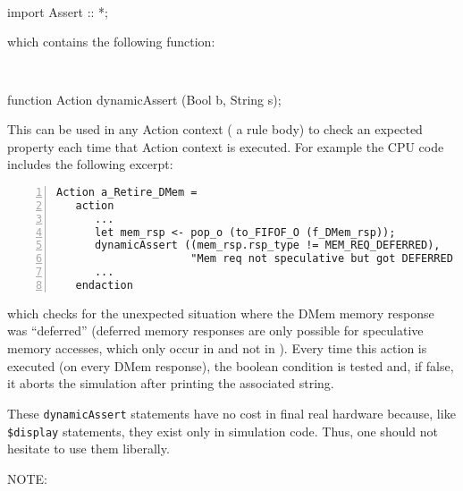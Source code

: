 {\tt
\begin{tabbing}
\hmmm import Assert :: *;
\end{tabbing}
}

which contains the following function:

{\tt
\begin{tabbing}
\hmmm function Action dynamicAssert (Bool b, String s);
\end{tabbing}
}

This can be used in any Action context ({\eg} a rule body) to check an
expected property each time that Action context is executed.  For
example the {\DRUM} CPU code includes the following excerpt:

{\footnotesize
\begin{Verbatim}[frame=single, numbers=left, label=src\_Drum/CPU.bsv]
   Action a_Retire_DMem =
   action
      ...
      let mem_rsp <- pop_o (to_FIFOF_O (f_DMem_rsp));
      dynamicAssert ((mem_rsp.rsp_type != MEM_REQ_DEFERRED),
                     "Mem req not speculative but got DEFERRED mem response");
      ...
   endaction
\end{Verbatim}
}

which checks for the unexpected situation where the DMem memory
response was ``deferred'' (deferred memory responses are only possible
for speculative memory accesses, which only occur in {\FIFE} and not
in {\DRUM}).  Every time this action is executed (on every DMem
response), the boolean condition is tested and, if false, it aborts
the simulation after printing the associated string.

These \verb|dynamicAssert| statements have no cost in final real
hardware because, like \verb|$display| statements, they exist only in
simulation code.  Thus, one should not hesitate to use them liberally.

\vspace{2ex}

NOTE: 


